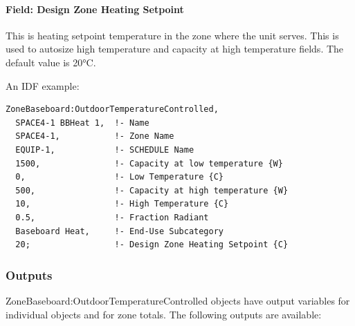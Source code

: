 \paragraph{Field: Design Zone Heating Setpoint}\label{field-design-zone-heating-setpoint}

This is heating setpoint temperature in the zone where the unit serves. This is used to autosize high temperature and capacity at high temperature fields. The default value is 20°C.

An IDF example:

\begin{lstlisting}
ZoneBaseboard:OutdoorTemperatureControlled,
  SPACE4-1 BBHeat 1,  !- Name
  SPACE4-1,           !- Zone Name
  EQUIP-1,            !- SCHEDULE Name
  1500,               !- Capacity at low temperature {W}
  0,                  !- Low Temperature {C}
  500,                !- Capacity at high temperature {W}
  10,                 !- High Temperature {C}
  0.5,                !- Fraction Radiant
  Baseboard Heat,     !- End-Use Subcategory
  20;                 !- Design Zone Heating Setpoint {C}
\end{lstlisting}

\subsubsection{Outputs}\label{outputs-14-002}

ZoneBaseboard:OutdoorTemperatureControlled objects have output variables for individual objects and for zone totals. The following outputs are available:

